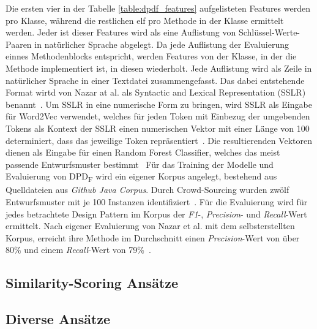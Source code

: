 Die ersten vier in der Tabelle \ref{table:dpdf_features} aufgelisteten Features werden pro Klasse, während die restlichen elf pro Methode in der Klasse ermittelt werden.
Jeder ist dieser Features wird als eine Auflistung von Schlüssel-Werte-Paaren in natürlicher Sprache abgelegt.
Da jede Auflistung der Evaluierung einnes Methodenblocks entspricht, werden Features von der Klasse, in der die Methode implementiert ist, in diesen wiederholt.
Jede Auflistung wird als Zeile in natürlicher Sprache in einer Textdatei zusammengefasst. Das dabei entstehende Format wirtd von Nazar at al. als Syntactic and Lexical Representation (SSLR) benannt~\cite[S. 1]{Nazar2020}.
Um SSLR in eine numerische Form zu bringen, wird SSLR als Eingabe für Word2Vec verwendet, welches für jeden Token mit Einbezug der umgebenden Tokens als Kontext der SSLR einen numerischen Vektor mit einer Länge von 100 determiniert, dass das jeweilige Token repräsentiert~\cite[S. 6]{Nazar2020}.
Die resultierenden Vektoren dienen als Eingabe für einen Random Forest Classifier, welches das meist passende Entwurfsmuster bestimmt~\cite[S. 7]{Nazar2020}
Für das Training der Modelle und Evaluierung von DPD\textsubscript{F} wird ein eigener Korpus angelegt, bestehend aus Quelldateien aus \textit{Github Java Corpus}. Durch Crowd-Sourcing wurden zwölf Entwurfsmuster mit je 100 Instanzen identifiziert~\cite[S. 4]{Nazar2020}.
Für die Evaluierung wird für jedes betrachtete Design Pattern im Korpus der \textit{F1}-, \textit{Precision}- und \textit{Recall}-Wert ermittelt. Nach eigener Evaluierung von Nazar et al. mit dem selbsterstellten Korpus, erreicht ihre Methode im Durchschnitt einen \textit{Precision}-Wert von über 80\% und einem \textit{Recall}-Wert von 79\%~\cite[S. 8]{Nazar2020}.   



\subsection{Similarity-Scoring Ansätze}

\subsection{Diverse Ansätze}




